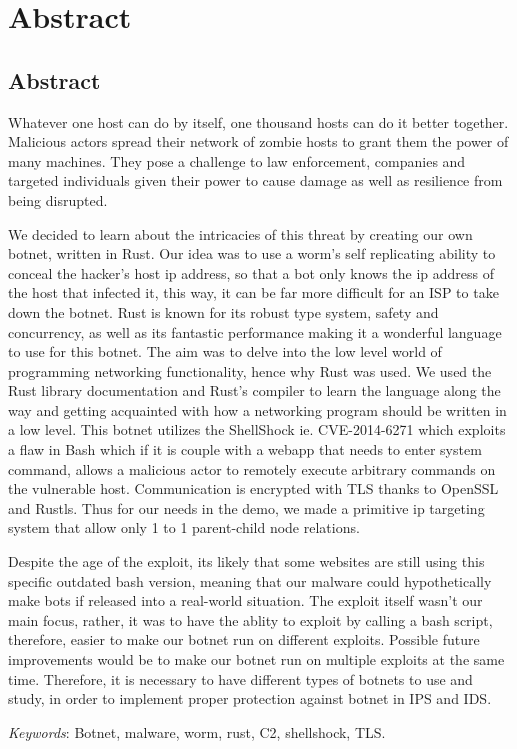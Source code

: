 \documentclass[../main.tex]{subfiles}
\begin{document}
    \newpage

	\chapter*{Abstract}

    \section*{Abstract}

    Whatever one host can do by itself, one thousand hosts can do it better together. 
    Malicious actors spread their network of zombie hosts to grant them the power of many machines.
    They pose a challenge to law enforcement, companies and targeted individuals given their power to cause damage as well as resilience from being disrupted.

    We decided to learn about the intricacies of this threat by creating our own botnet, written in Rust. 
    Our idea was to use a worm's self replicating ability to conceal the hacker's host ip address, so that a bot only knows the ip address of the host that infected it, this way, it can be far more difficult for an ISP to take down the botnet.
    Rust is known for its robust type system, safety and concurrency, as well as its fantastic performance making it a wonderful language to use for this botnet.
    The aim was to delve into the low level world of programming networking functionality, hence why Rust was used. 
    We used the Rust library documentation and Rust's compiler to learn the language along the way and getting acquainted with how a networking program should be written in a low level.
    This botnet utilizes the ShellShock ie. CVE-2014-6271 which exploits a flaw in Bash which if it is couple with a webapp that needs to enter system command, allows a malicious actor to remotely execute arbitrary commands on the vulnerable host.
    Communication is encrypted with TLS thanks to OpenSSL and Rustls. 
    Thus for our needs in the demo, we made a primitive ip targeting system that allow only 1 to 1 parent-child node relations.

    Despite the age of the exploit, its likely that some websites are still using this specific outdated bash version, meaning that our malware could hypothetically make bots if released into a real-world situation. 
    The exploit itself wasn't our main focus, rather, it was to have the ablity to exploit by calling a bash script, therefore, easier to make our botnet run on different exploits. 
    Possible future improvements would be to make our botnet run on multiple exploits at the same time.
    Therefore, it is necessary to have different types of botnets to use and study, in order to implement proper protection against botnet in IPS and IDS.


	\vspace{10pt}

	\qquad \textit{Keywords}: Botnet, malware, worm, rust, C2, shellshock, TLS.
\end{document}
